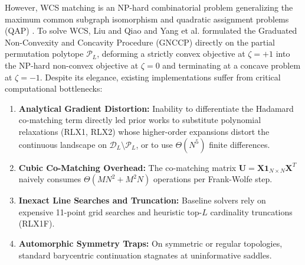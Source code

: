 \documentclass[conference]{IEEEtran}
\begin{document}
However, WCS matching is an NP-hard combinatorial problem generalizing the maximum common subgraph isomorphism and quadratic assignment problems (QAP) \cite{garey1979, loiola2007}. To solve WCS, Liu and Qiao \cite{liu2015graduated} and Yang et al. \cite{yang2018algorithm} formulated the Graduated Non-Convexity and Concavity Procedure (GNCCP) directly on the partial permutation polytope $\mathcal{P}_L$, deforming a strictly convex objective at $\zeta=+1$ into the NP-hard non-convex objective at $\zeta=0$ and terminating at a concave problem at $\zeta=-1$. Despite its elegance, existing implementations suffer from critical computational bottlenecks:
\begin{enumerate}
    \item \textbf{Analytical Gradient Distortion:} Inability to differentiate the Hadamard co-matching term directly led prior works to substitute polynomial relaxations (RLX1, RLX2) whose higher-order expansions distort the continuous landscape on $\mathcal{D}_L \setminus \mathcal{P}_L$, or to use $\Theta(N^5)$ finite differences.
    \item \textbf{Cubic Co-Matching Overhead:} The co-matching matrix $\mathbf{U} = \mathbf{X}\mathbf{1}_{N\times N}\mathbf{X}^T$ naively consumes $\Theta(MN^2 + M^2N)$ operations per Frank-Wolfe step.
    \item \textbf{Inexact Line Searches and Truncation:} Baseline solvers rely on expensive 11-point grid searches and heuristic top-$L$ cardinality truncations (RLX1F).
    \item \textbf{Automorphic Symmetry Traps:} On symmetric or regular topologies, standard barycentric continuation stagnates at uninformative saddles.
\end{enumerate}
\end{document}
